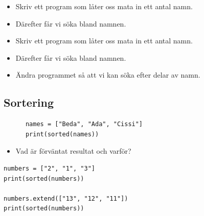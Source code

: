 \begin{frame}[fragile]
  \begin{exercise}[search.py]
    \begin{itemize}
      \item Skriv ett program som låter oss mata in ett antal 
        namn.
      \item Därefter får vi söka bland namnen.
    \end{itemize}
  \end{exercise}
\end{frame}

\begin{frame}[fragile]
  \begin{exercise}[search.py]
    \begin{itemize}
      \item Skriv ett program som låter oss mata in ett antal 
        namn.
      \item Därefter får vi söka bland namnen.
    \end{itemize}
  \end{exercise}

  \begin{exercise}
    \begin{itemize}
      \item Ändra programmet så att vi kan söka efter delar av namn.
    \end{itemize}
  \end{exercise}
\end{frame}

\subsection{Sortering}

\begin{frame}[fragile]
  \begin{example}[Sortering]
    \begin{verbatim}
      names = ["Beda", "Ada", "Cissi"]
      print(sorted(names))
    \end{verbatim}
  \end{example}

  \begin{exercise}
    \begin{itemize}
      \item Vad är förväntat resultat och varför?
    \end{itemize}
    \begin{verbatim}
numbers = ["2", "1", "3"]
print(sorted(numbers))

numbers.extend(["13", "12", "11"])
print(sorted(numbers))
    \end{verbatim}
  \end{exercise}
\end{frame}


